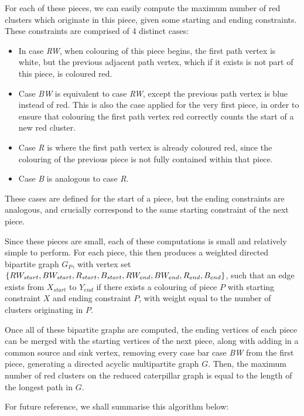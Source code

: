 \documentclass{mpaper}
\begin{document}
For each of these pieces, we can easily compute the maximum number of red clusters which originate in this piece, given some starting and ending constraints. These constraints are comprised of 4 distinct cases:

\begin{itemize}
  \item In case \emph{RW}, when colouring of this piece begins, the first path vertex is white, but the previous adjacent path vertex, which if it exists is not part of this piece, is coloured red.
  \item Case \emph{BW} is equivalent to case \emph{RW}, except the previous path vertex is blue instead of red. This is also the case applied for the very first piece, in order to ensure that colouring the first path vertex red correctly counts the start of a new red cluster.
  \item Case \emph{R} is where the first path vertex is already coloured red, since the colouring of the previous piece is not fully contained within that piece.
  \item Case \emph{B} is analogous to case \emph{R}.
\end{itemize}

These cases are defined for the start of a piece, but the ending constraints are analogous, and crucially correspond to the same starting constraint of the next piece.

Since these pieces are small, each of these computations is small and relatively simple to perform. For each piece, this then produces a weighted directed bipartite graph $G_P$, with vertex set $\{RW_{start}, BW_{start}, R_{start}, B_{start}, \\ RW_{end}, BW_{end}, R_{end}, B_{end}\}$, such that an edge exists from $X_{start}$ to $Y_{end}$ if there exists a colouring of piece $P$ with starting constraint $X$ and ending constraint $P$, with weight equal to the number of clusters originating in $P$.

Once all of these bipartite graphs are computed, the ending vertices of each piece can be merged with the starting vertices of the next piece, along with adding in a common source and sink vertex, removing every case bar case \emph{BW} from the first piece, generating a directed acyclic multipartite graph $G$. Then, the maximum number of red clusters on the reduced caterpillar graph is equal to the length of the longest path in $G$.

For future reference, we shall summarise this algorithm below:
\end{document}

